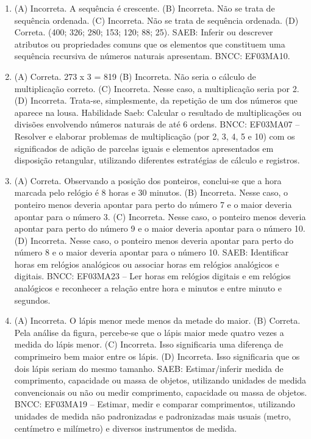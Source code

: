 \begin{enumerate}
\item
(A) Incorreta. A sequência é crescente.
(B) Incorreta. Não se trata de sequência ordenada.
(C) Incorreta. Não se trata de sequência ordenada.
(D) Correta. (400; 326; 280; 153; 120; 88; 25).
SAEB: Inferir ou descrever atributos ou propriedades comuns
que os elementos que constituem uma sequência recursiva de números
naturais apresentam.
BNCC: EF03MA10.

\item
(A) Correta. 273 x 3 = 819
(B) Incorreta. Não seria o cálculo de multiplicação correto.
(C) Incorreta. Nesse caso, a multiplicação seria por 2.
(D) Incorreta. Trata-se, simplesmente, da repetição de um dos números que aparece na lousa.
Habilidade Saeb: Calcular o resultado de multiplicações ou divisões
envolvendo números naturais de até 6 ordens.
BNCC: EF03MA07 – Resolver e elaborar problemas de multiplicação (por 2, 3, 4, 5 e 10) com os
significados de adição de parcelas iguais e elementos apresentados em disposição retangular,
utilizando diferentes estratégias de cálculo e registros.

\item
(A) Correta. Observando a posição dos ponteiros, conclui-se que a hora marcada pelo
relógio é 8 horas e 30 minutos.
(B) Incorreta. Nesse caso, o ponteiro menos deveria apontar para perto do número 7 e o maior deveria apontar para o número 3.
(C) Incorreta. Nesse caso, o ponteiro menos deveria apontar para perto do número 9 e o maior deveria apontar para o número 10.
(D) Incorreta. Nesse caso, o ponteiro menos deveria apontar para perto do número 8 e o maior deveria apontar para o número 10.
SAEB: Identificar horas em relógios analógicos ou associar
horas em relógios analógicos e digitais.
BNCC: EF03MA23 – Ler horas em relógios digitais e em relógios analógicos e reconhecer a relação
entre hora e minutos e entre minuto e segundos.

\item
(A) Incorreta. O lápis menor mede menos da metade do maior.
(B) Correta. Pela análise da figura, percebe-se que o lápis maior mede quatro vezes a medida do lápis menor.
(C) Incorreta. Isso significaria uma diferença de comprimeiro bem maior entre os lápis.
(D) Incorreta. Isso significaria que os dois lápis seriam do mesmo tamanho.
SAEB: Estimar/inferir medida de comprimento, capacidade ou
massa de objetos, utilizando unidades de medida convencionais ou não ou
medir comprimento, capacidade ou massa de objetos.
BNCC: EF03MA19 -- Estimar, medir e comparar comprimentos, utilizando unidades de medida
não padronizadas e padronizadas mais usuais (metro, centímetro e milímetro) e diversos
instrumentos de medida.
\end{enumerate}

